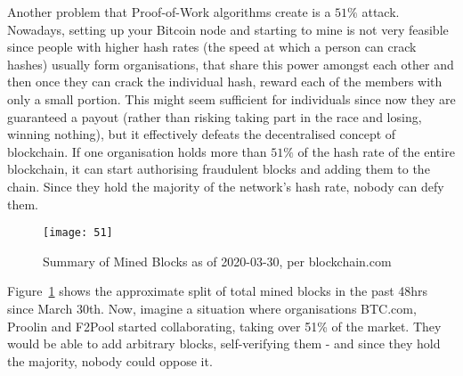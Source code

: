 Another problem that Proof-of-Work algorithms create is a $51\%$ attack. Nowadays, setting up your Bitcoin node and starting to mine is not very feasible since people with higher hash rates (the speed at which a person can crack hashes) usually form organisations, that share this power amongst each other and then once they can crack the individual hash, reward each of the members with only a small portion. This might seem sufficient for individuals since now they are guaranteed a payout (rather than risking taking part in the race and losing, winning nothing), but it effectively defeats the decentralised concept of blockchain. If one organisation holds more than $51\%$ of the hash rate of the entire blockchain, it can start authorising fraudulent blocks and adding them to the chain. Since they hold the majority of the network's hash rate, nobody can defy them. 

\begin{figure}[h]
    \centering
    \texttt{[image: 51]}
    \caption{Summary of Mined Blocks as of 2020-03-30, per blockchain.com}
    \label{fig:51}
\end{figure}

Figure~\ref{fig:51} shows the approximate split of total mined blocks in the past 48hrs since March 30th. Now, imagine a situation where organisations BTC.com, Proolin and F2Pool started collaborating, taking over 51\% of the market. They would be able to add arbitrary blocks, self-verifying them - and since they hold the majority, nobody could oppose it.
